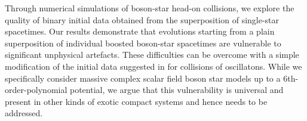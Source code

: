 

Through numerical simulations of boson-star head-on collisions,
we explore
the quality of binary initial data obtained from the superposition
of single-star spacetimes. 
Our results demonstrate that evolutions starting from a
plain superposition of individual boosted boson-star spacetimes
are vulnerable to significant unphysical artefacts. These
difficulties can be overcome with a simple modification of the
initial data suggested in \cite{Helfer:2018vtq} for collisions of oscillatons.
While we specifically consider massive complex scalar field boson star models up to a 6th-order-polynomial potential, we argue that this vulnerability is universal and present in other kinds of
exotic compact systems and hence needs to be addressed.




